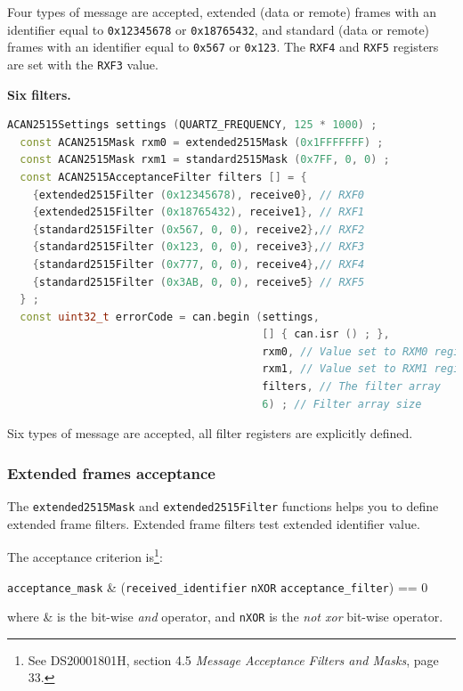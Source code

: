\documentclass[10pt, a4paper, obeyspaces, openany]{extarticle}
\begin{document}
Four types of message are accepted, extended (data or remote) frames with an identifier equal to \texttt{0x12345678} or \texttt{0x18765432}, and standard (data or remote) frames with an identifier equal to \texttt{0x567} or \texttt{0x123}. The \texttt{RXF4} and \texttt{RXF5} registers are set with the \texttt{RXF3} value.








{\bf Six filters.}
{ \small\begin{lstlisting}[language=c++]
  ACAN2515Settings settings (QUARTZ_FREQUENCY, 125 * 1000) ;
  const ACAN2515Mask rxm0 = extended2515Mask (0x1FFFFFFF) ;
  const ACAN2515Mask rxm1 = standard2515Mask (0x7FF, 0, 0) ;
  const ACAN2515AcceptanceFilter filters [] = {
    {extended2515Filter (0x12345678), receive0}, // RXF0
    {extended2515Filter (0x18765432), receive1}, // RXF1
    {standard2515Filter (0x567, 0, 0), receive2},// RXF2
    {standard2515Filter (0x123, 0, 0), receive3},// RXF3
    {standard2515Filter (0x777, 0, 0), receive4},// RXF4
    {standard2515Filter (0x3AB, 0, 0), receive5} // RXF5
  } ;
  const uint32_t errorCode = can.begin (settings,
                                        [] { can.isr () ; },
                                        rxm0, // Value set to RXM0 register
                                        rxm1, // Value set to RXM1 register
                                        filters, // The filter array
                                        6) ; // Filter array size
\end{lstlisting}}

Six types of message are accepted, all filter registers are explicitly defined.










\subsubsection{Extended frames acceptance}

The \texttt{extended2515Mask} and \texttt{extended2515Filter} functions helps you to define extended frame filters. Extended frame filters test extended identifier value.

The acceptance criterion is\footnote{See DS20001801H, section 4.5 \emph{Message Acceptance Filters and Masks}, page 33.}:

\begin{center}
\texttt{acceptance\_mask} \& (\texttt{received\_identifier} \texttt{nXOR} \texttt{acceptance\_filter}) == 0
\end{center}
where \& is the bit-wise \emph{and} operator, and \texttt{nXOR} is the \emph{not xor} bit-wise operator.
\end{document}
